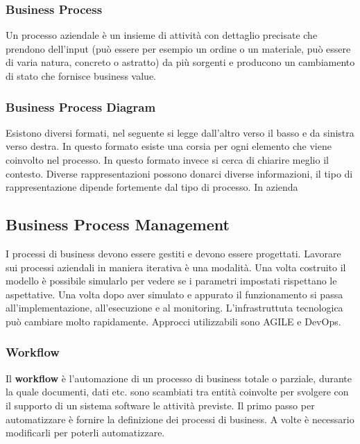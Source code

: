 \subsubsection{Business Process}
Un processo aziendale è un insieme di attività con dettaglio precisate che prendono dell'input (può essere per esempio un ordine o un materiale, può essere di varia natura, concreto o astratto) da più sorgenti e producono un cambiamento di stato che fornisce business value. 
\subsubsection{Business Process Diagram}
Esistono diversi formati, nel seguente si legge dall'altro verso il basso e da sinistra verso destra.
In questo formato esiste una corsia per ogni elemento che viene coinvolto nel processo.
In questo formato invece si cerca di chiarire meglio il contesto.
Diverse rappresentazioni possono donarci diverse informazioni, il tipo di rappresentazione dipende fortemente dal tipo di processo. In azienda
\subsection{Business Process Management}
I processi di business devono essere gestiti e devono essere progettati. Lavorare sui processi aziendali in maniera iterativa è una modalità. Una volta costruito il modello è possibile simularlo per vedere se i parametri impostati rispettano le aspettative. Una volta dopo aver simulato e appurato il funzionamento si passa all'implementazione, all'esecuzione e al monitoring. L'infrastruttuta tecnologica può cambiare molto rapidamente. Approcci utilizzabili sono AGILE e DevOps.

\subsubsection{Workflow}
Il \textbf{workflow} è l'automazione di un processo di business totale o parziale, durante la quale documenti, dati etc. sono scambiati tra entità coinvolte per svolgere con il supporto di un sistema software le attività previste.\newline
Il primo passo per automatizzare è fornire la definizione dei processi di business. A volte è necessario modificarli per poterli automatizzare.

